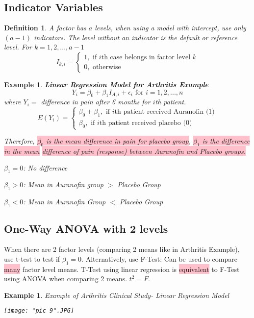 \documentclass[a4paper,11pt]{article}
\newtheorem{defn}[thm]{Definition}
\newtheorem{eg}[thm]{Example}
\begin{document}
\subsection{Indicator Variables}
\begin{defn}
\normalfont
A factor has $a$ levels, when using a model with intercept, use only $(a-1)$ indicators. The level without an indicator is the default or reference level. For $k=1,2,...,a-1$
$$
I_{k,i}=
\begin{cases}
1, \text{\ if $i$th case belongs in factor level $k$}\\
0, \text{\ otherwise}
\end{cases}
$$
\end{defn}
\begin{eg}
\normalfont
\textbf{Linear Regression Model for Arthritis Example}
$$Y_i=\beta_0+\beta_1I_{A,i}+\epsilon_i\text{ for } i=1,2,...,n$$
where $Y_i=$ difference in pain after 6 months for $i$th patient. 
$$
E(Y_i)=
\begin{cases}
\beta_0+\beta_1, \text{\ if $i$th patient received Auranofin (1)}\\
\beta_0, \text{\ if $i$th patient received placebo (0)}
\end{cases}
$$

Therefore, \colorbox{pink}{$\beta_0$ is the mean difference in pain for placebo group}, \colorbox{pink}{$\beta_1$ is the difference in the mean} \colorbox{pink}{difference of pain (response) between Auranofin and Placebo groups. }

$\beta_1=0$: No difference

$\beta_1>0$: Mean in Auranofin group $>$ Placebo Group

$\beta_1<0$: Mean in Auranofin Group $<$ Placebo Group
\end{eg}

\subsection{One-Way ANOVA with 2 levels}
When there are 2 factor levels (comparing 2 means like in Arthritis Example), use t-test to test if $\beta_1=0$. Alternatively, use F-Test: Can be used to compare \colorbox{pink}{many} factor level means. T-Test using linear regression is \colorbox{pink}{equivalent} to F-Test using ANOVA when comparing 2 means. $t^2=F$. 
\newpage
\begin{eg}
\normalfont
Example of Arthritis Clinical Study- Linear Regression Model

\begin{center}
	\texttt{[image: "pic 9".JPG]}
\end{center}

\end{eg}
\end{document}
